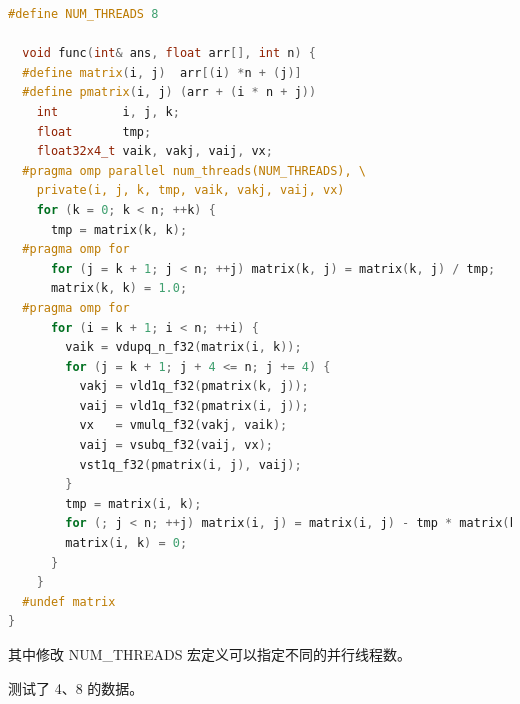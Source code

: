 \documentclass[a4paper]{article}
\begin{document}
\begin{lstlisting}[title=arm OpenMP + NEON 并行化加速,frame=trbl,language={C++}]
  #define NUM_THREADS 8

  void func(int& ans, float arr[], int n) {
  #define matrix(i, j)  arr[(i) *n + (j)]
  #define pmatrix(i, j) (arr + (i * n + j))
    int         i, j, k;
    float       tmp;
    float32x4_t vaik, vakj, vaij, vx;
  #pragma omp parallel num_threads(NUM_THREADS), \
    private(i, j, k, tmp, vaik, vakj, vaij, vx)
    for (k = 0; k < n; ++k) {
      tmp = matrix(k, k);
  #pragma omp for
      for (j = k + 1; j < n; ++j) matrix(k, j) = matrix(k, j) / tmp;
      matrix(k, k) = 1.0;
  #pragma omp for
      for (i = k + 1; i < n; ++i) {
        vaik = vdupq_n_f32(matrix(i, k));
        for (j = k + 1; j + 4 <= n; j += 4) {
          vakj = vld1q_f32(pmatrix(k, j));
          vaij = vld1q_f32(pmatrix(i, j));
          vx   = vmulq_f32(vakj, vaik);
          vaij = vsubq_f32(vaij, vx);
          vst1q_f32(pmatrix(i, j), vaij);
        }
        tmp = matrix(i, k);
        for (; j < n; ++j) matrix(i, j) = matrix(i, j) - tmp * matrix(k, j);
        matrix(i, k) = 0;
      }
    }
  #undef matrix
}
\end{lstlisting}

其中修改 NUM\_THREADS 宏定义可以指定不同的并行线程数。

测试了 4、8 的数据。
\end{document}
